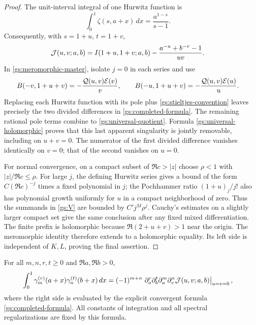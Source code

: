 \begin{proof}
The unit-interval integral of one Hurwitz function is
\[
 \int_0^1\zeta(s,a+x)\,dx=\frac{a^{1-s}}{s-1}.
\]
Consequently, with $s=1+u$, $t=1+v$,
\begin{equation}\label{gs:pole-removal}
 \mathcal J(u,v;a,b)=I(1+u,1+v;a,b)
             -\frac{a^{-u}+b^{-v}-1}{uv}.
\end{equation}
In \eqref{gs:meromorphic-master}, isolate $j=0$ in each series and
use
\[
 B(-v,1+u+v)=-\frac{\mathcal Q(u,v)\mathcal E(v)}v,
 \qquad
 B(-u,1+u+v)=-\frac{\mathcal Q(u,v)\mathcal E(u)}u.
\]
Replacing each Hurwitz function with its pole plus \eqref{gs:stieltjes-convention}
leaves precisely the two divided differences in
\eqref{gs:completed-formula}.  The remaining rational pole terms
combine to \eqref{gs:universal-quotient}.  Formula
\eqref{gs:universal-holomorphic} proves that this last apparent
singularity is jointly removable, including on $u+v=0$.
The numerator of the first divided difference vanishes identically
on $v=0$; that of the second vanishes on $u=0$.

For normal convergence, on a compact subset of
$\Re c>|z|$ choose $\rho<1$ with $|z|/\Re c\le\rho$.
For large $j$, the defining Hurwitz series gives a bound of the form
$C(\Re c)^{-j}$ times a fixed polynomial in $j$; the Pochhammer
ratio $(1+u)_j/j!$ also has polynomial growth uniformly for $u$ in
a compact neighborhood of zero.  Thus the summands in
\eqref{gs:V} are bounded by $C'j^M\rho^j$.  Cauchy's estimates
on a slightly larger compact set give the same conclusion after any
fixed mixed differentiation.  The finite prefix is holomorphic
because $\Re(2+u+v)>1$ near the origin.
The meromorphic identity therefore extends to a holomorphic equality.
Its left side is independent of $K,L$, proving the final assertion.
\end{proof}

\begin{corollary}
\label{gs:all-indices}
For all $m,n,r,t\ge0$ and $\Re a,\Re b>0$,
\begin{equation}\label{gs:all-indices-formula}
 \int_0^1\gamma_m^{(r)}(a+x)\gamma_n^{(t)}(b+x)\,dx
 =(-1)^{m+n}
 \left.\partial_a^r\partial_b^t\partial_u^m\partial_v^n
                  \mathcal J(u,v;a,b)\right|_{u=v=0},
\end{equation}
where the right side is evaluated by the explicit convergent formula
\eqref{gs:completed-formula}.  All constants of integration and all
spectral regularizations are fixed by this formula.
\end{corollary}

